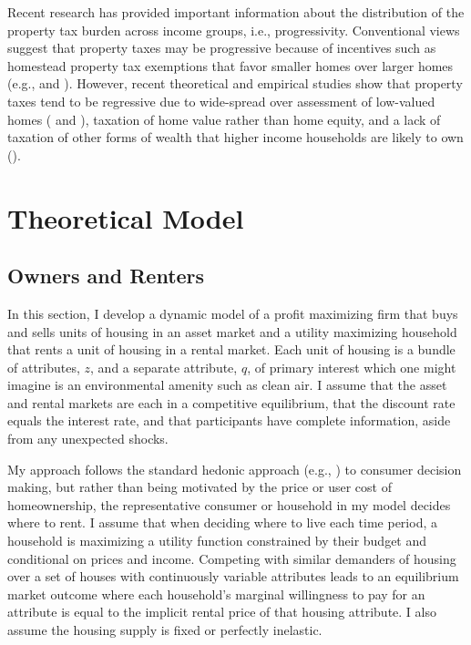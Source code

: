 \documentclass[ecta,nameyear,draft]{econsocart}
\theoremstyle{plain}
\theoremstyle{remark}
\begin{document}
Recent research has provided important information about the distribution of the property tax burden across income groups, i.e., progressivity. Conventional views suggest that property taxes may be progressive because of incentives such as homestead property tax exemptions that favor smaller homes over larger homes (e.g., \cite{zodrow14} and \cite{mcmillen20}).  However, recent theoretical and empirical studies show that property taxes tend to be regressive due to wide-spread over assessment of low-valued homes (\cite{mcmillen20} and \cite{berry21}), taxation of home value rather than home equity, and a lack of taxation of other forms of wealth that higher income households are likely to own (\cite{levinson21}).







\section{Theoretical Model}
\subsection{Owners and Renters}
In this section, I develop a dynamic model of a profit maximizing firm that buys and sells units of housing in an asset market and a utility maximizing household that rents a unit of housing in a rental market. Each unit of housing is a bundle of attributes, $z$, and a separate attribute, $q$, of primary interest which one might imagine is an environmental amenity such as clean air. I assume that the asset and rental markets are each in a competitive equilibrium, that the discount rate equals the interest rate, and that participants have complete information, aside from any unexpected shocks.

My approach follows the standard hedonic approach (e.g., \cite{rosen74}) to consumer decision making, but rather than being motivated by the price or user cost of homeownership, the representative consumer or household in my model decides where to rent. I assume that when deciding where to live each time period, a household is maximizing a utility function constrained by their budget and conditional on prices and income. Competing with similar demanders of housing over a set of houses with continuously variable attributes leads to an equilibrium market outcome where each household's marginal willingness to pay for an attribute is equal to the implicit rental price of that housing attribute. I also assume the housing supply is fixed or perfectly inelastic.
\end{document}
